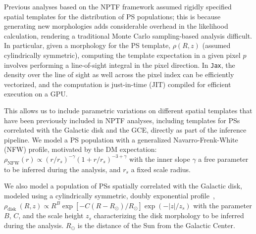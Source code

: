\documentclass[prd,aps,10pt,nofootinbib,twocolumn,superscriptaddress,preprintnumbers,balancelastpage,longbibliography,floatfix]{revtex4-2}
\newcommand{\ys}[1]{{\color{overleaf} {\bf [YS: #1]}}}
\begin{document}
Previous analyses based on the NPTF framework assumed rigidly specified spatial templates for the distribution of PS populations; this is because generating new morphologies adds considerable overhead in the likelihood calculation, rendering a traditional Monte Carlo sampling-based analysis difficult. In particular, given a morphology for the PS template, $\rho(R, z)$ (assumed cylindrically symmetric), computing the template expectation in a given pixel $p$ involves performing a line-of-sight integral in the pixel direction.
In \texttt{Jax}, the density over the line of sight as well across the pixel index can be efficiently vectorized, and the computation is just-in-time (JIT) compiled for efficient execution on a GPU.

This allows us to include parametric variations on different spatial templates that have been previously included in NPTF analyses, including templates for PSs correlated with the Galactic disk and the GCE, directly as part of the inference pipeline. We model a PS population with a generalized Navarro-Frenk-White (NFW) profile, motivated by the DM expectation:
$\rho_{\mathrm{NFW}}(r) \propto\left({r}/{r_s}\right)^{-\gamma}\left(1+{r}/{r_s}\right)^{-3+\gamma}$ with the inner slope $\gamma$ a free parameter to be inferred during the analysis, and $r_s$ a fixed scale radius.

We also model a population of PSs spatially correlated with the Galactic disk, modeled using a cylindrically symmetric, doubly exponential profile~\cite{bartels2018bayesian,lorimer2006parkes}, $\rho_{\text {disk }}(R, z) \propto {R}^B\exp \left[-C\left({R-R_{\odot}}\right)/{R_\odot}\right] \exp \left(-{|z|}/{z_s}\right)$ with the parameter $B$, $C$, and the scale height $z_s$ characterizing the disk morphology to be inferred during the analysis. $R_{\odot}$ is the distance of the Sun from the Galactic Center. %
\end{document}

